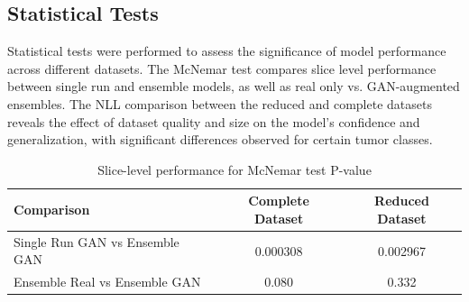\subsection{Statistical Tests}

Statistical tests were performed to assess the significance of model performance across different datasets. The McNemar test compares slice level performance between single run and ensemble models, as well as real only vs. GAN-augmented ensembles. The NLL comparison between the reduced and complete datasets reveals the effect of dataset quality and size on the model's confidence and generalization, with significant differences observed for certain tumor classes.

\begin{table}[ht]
\centering
\caption{Slice-level performance for McNemar test P-value}
\begin{tabular}{lcc}
\toprule
\textbf{Comparison} & \textbf{Complete Dataset} & \textbf{Reduced Dataset} \\
\midrule
Single Run GAN vs Ensemble GAN & 0.000308 & 0.002967 \\
Ensemble Real vs Ensemble GAN & 0.080 & 0.332 \\
\bottomrule
\end{tabular}
\label{tab:mcnemar_comparison_side_by_side}
\end{table}


